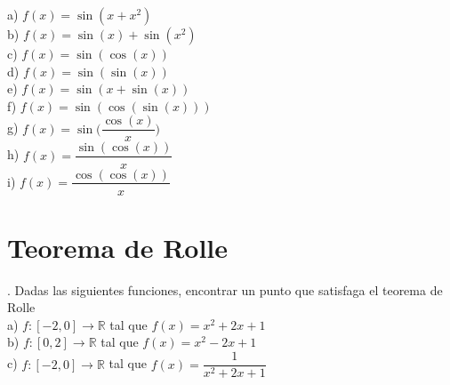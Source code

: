 \documentclass[letterpaper]{article}
\begin{document}
a) $ f(x) = \sin(x + x^{2}) $\\


b) $ f(x) = \sin(x)+\sin(x^{2}) $\\


c) $ f(x) = \sin(\cos(x)) $\\


d) $ f(x) = \sin(\sin(x)) $\\


e) $ f(x) = \sin(x + \sin(x)) $\\


f) $ f(x) = \sin(\cos(\sin(x))) $\\


g) $ f(x) = \sin\Big(\dfrac{\cos(x)}{x}\Big) $\\


h) $ f(x) = \dfrac{\sin(\cos(x))}{x} $\\


i) $ f(x) = \dfrac{\cos(\cos(x))}{x} $\\


\section*{Teorema de Rolle}

. Dadas las siguientes funciones, encontrar un punto que satisfaga el teorema de Rolle\\

a) $ f : [-2,0] \longrightarrow \mathds{R} $ tal que $ f(x) = x^{2} + 2x + 1 $\\


b) $ f : [0,2] \longrightarrow \mathds{R} $ tal que $ f(x) = x^{2} - 2x + 1 $\\


c) $ f : [-2,0] \longrightarrow \mathds{R} $ tal que $ f(x) = \dfrac{1}{x^{2} + 2x + 1} $\\
\end{document}
